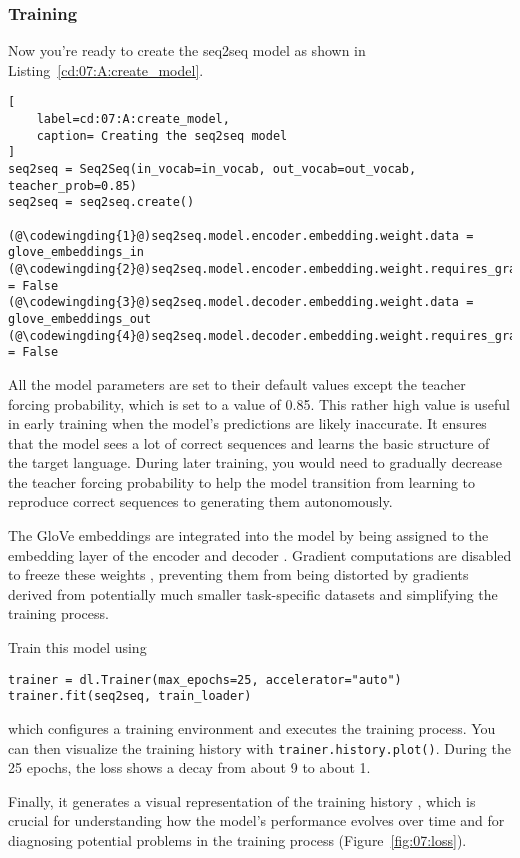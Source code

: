 \subsubsection{Training}

Now you're ready to create the seq2seq model as shown in Listing~\ref{cd:07:A:create_model}.
\begin{lstlisting}[
    label=cd:07:A:create_model,
    caption= Creating the seq2seq model
]
seq2seq = Seq2Seq(in_vocab=in_vocab, out_vocab=out_vocab, teacher_prob=0.85)
seq2seq = seq2seq.create()

(@\codewingding{1}@)seq2seq.model.encoder.embedding.weight.data = glove_embeddings_in
(@\codewingding{2}@)seq2seq.model.encoder.embedding.weight.requires_grad = False
(@\codewingding{3}@)seq2seq.model.decoder.embedding.weight.data = glove_embeddings_out
(@\codewingding{4}@)seq2seq.model.decoder.embedding.weight.requires_grad = False
\end{lstlisting}
All the model parameters are set to their default values except the teacher forcing probability, which is set to a value of 0.85. This rather high value is useful in early training when the model's predictions are likely inaccurate. It ensures that the model sees a lot of correct sequences and learns the basic structure of the target language. During later training, you would need to gradually decrease the teacher forcing probability to help the model transition from learning to reproduce correct sequences to generating them autonomously.

The GloVe embeddings are integrated into the model by being assigned to the embedding layer of the encoder  and decoder . Gradient computations are disabled to freeze these weights , preventing them from being distorted by gradients derived from potentially much smaller task-specific datasets and simplifying the training process.

Train this model using
\begin{lstlisting}
trainer = dl.Trainer(max_epochs=25, accelerator="auto")
trainer.fit(seq2seq, train_loader)
\end{lstlisting}
which configures a training environment and executes the training process.
You can then visualize the training history with \lstinline{trainer.history.plot()}.
During the 25 epochs, the loss shows a decay from about 9 to about 1.

\iffalse %
Finally, it generates a visual representation of the training history , which is crucial for understanding how the model's performance evolves over time and for diagnosing potential problems in the training process (Figure~\ref{fig:07:loss}).

